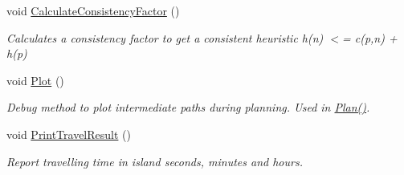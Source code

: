\begin{DoxyCompactItemize}
void \mbox{\hyperlink{classplanner_1_1c_planner_a2e5a745f83f903662eff914d8beddb5e}{Calculate\+Consistency\+Factor}} ()
\begin{DoxyCompactList}\small\item\em Calculates a consistency factor to get a consistent heuristic h(n) $<$= c(p,n) + h(p) \end{DoxyCompactList}\item 
\mbox{\label{classplanner_1_1c_planner_a236a68e02c7a99323f2d30b3097aa767}} 
void \mbox{\hyperlink{classplanner_1_1c_planner_a236a68e02c7a99323f2d30b3097aa767}{Plot}} ()
\begin{DoxyCompactList}\small\item\em Debug method to plot intermediate paths during planning. Used in \mbox{\hyperlink{classplanner_1_1c_planner_a21230c015260b9fc34ad2f239592470e}{Plan()}}. \end{DoxyCompactList}\item 
\mbox{\label{classplanner_1_1c_planner_ad8d82968444f958f1b7e7acdd9df2e64}} 
void \mbox{\hyperlink{classplanner_1_1c_planner_ad8d82968444f958f1b7e7acdd9df2e64}{Print\+Travel\+Result}} ()
\begin{DoxyCompactList}\small\item\em Report travelling time in island seconds, minutes and hours. \end{DoxyCompactList}\end{DoxyCompactItemize}

